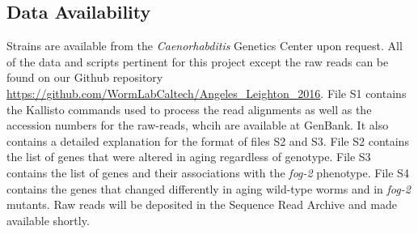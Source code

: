 \documentclass[10pt,letterpaper,twocolumn]{article}
\newcommand{\fog}{\emph{\mbox{fog-2}}}
\begin{document}
\subsection*{Data Availability}
\label{sb:data_availability}
Strains are available from the \emph{Caenorhabditis} Genetics Center upon
request. All of the data and scripts pertinent for this project except the raw
reads can be found on our Github repository
\url{https://github.com/WormLabCaltech/Angeles_Leighton_2016}. File S1 contains
the Kallisto commands used to process the read alignments as well as the
accession numbers for the raw-reads, whcih are available at GenBank. It also
contains a detailed explanation for the format of files S2 and S3. File S2
contains the list of genes that were altered in aging regardless of genotype.
File S3 contains the list of genes and their associations with the \fog{}
phenotype. File S4 contains the genes that changed differently in aging
wild-type worms and in \fog{} mutants. Raw reads will be deposited in the
Sequence Read Archive and made available shortly.
\end{document}
